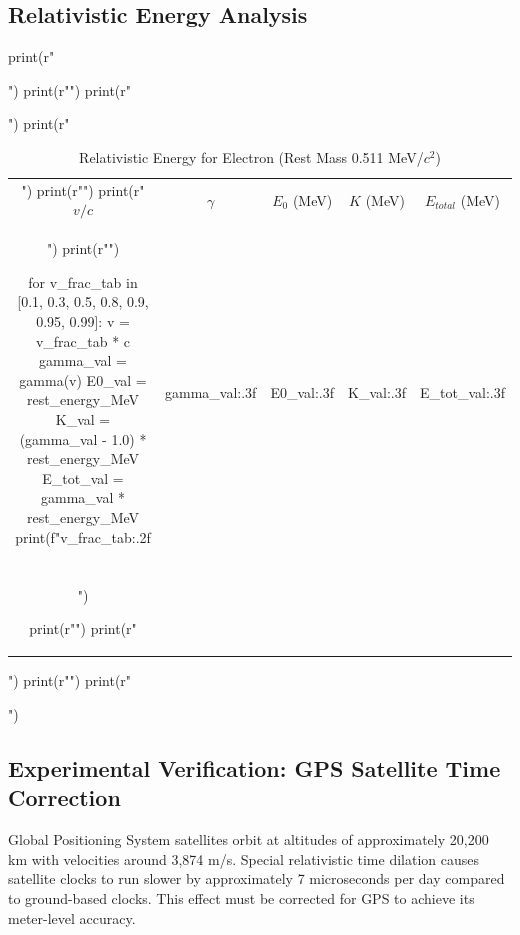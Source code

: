 \documentclass[a4paper, 11pt]{article}
\begin{document}
\subsection{Relativistic Energy Analysis}

\begin{pycode}
print(r"\begin{table}[htbp]")
print(r"\centering")
print(r"\caption{Relativistic Energy for Electron (Rest Mass 0.511 MeV/$c^2$)}")
print(r"\begin{tabular}{ccccc}")
print(r"\toprule")
print(r"$v/c$ & $\gamma$ & $E_0$ (MeV) & $K$ (MeV) & $E_{total}$ (MeV) \\")
print(r"\midrule")

for v_frac_tab in [0.1, 0.3, 0.5, 0.8, 0.9, 0.95, 0.99]:
    v = v_frac_tab * c
    gamma_val = gamma(v)
    E0_val = rest_energy_MeV
    K_val = (gamma_val - 1.0) * rest_energy_MeV
    E_tot_val = gamma_val * rest_energy_MeV
    print(f"{v_frac_tab:.2f} & {gamma_val:.3f} & {E0_val:.3f} & {K_val:.3f} & {E_tot_val:.3f} \\\\")

print(r"\bottomrule")
print(r"\end{tabular}")
print(r"\label{tab:energy}")
print(r"\end{table}")
\end{pycode}

\subsection{Experimental Verification: GPS Satellite Time Correction}

Global Positioning System satellites orbit at altitudes of approximately 20,200 km with
velocities around 3,874 m/s. Special relativistic time dilation causes satellite clocks to
run slower by approximately 7 microseconds per day compared to ground-based clocks. This
effect must be corrected for GPS to achieve its meter-level accuracy.
\end{document}
